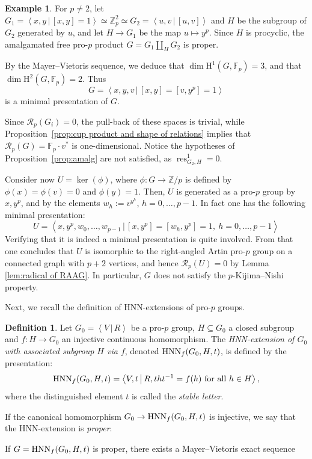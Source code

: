 \documentclass{amsart}
\theoremstyle{definition}
\newtheorem{defn}[thm]{Definition}
\newtheorem{ex}[thm]{Example}
\theoremstyle{remark}
\DeclareMathOperator{\res}{res}
\newcommand{\HNN}{{\rm HNN}}
\newcommand{\ZZ}{\mathbb{Z}}
\newcommand{\FF}{\mathbb{F}}
\newcommand{\calR}{\mathcal{R}}
\newcommand{\rmH}{\mathrm H}%
\newcommand{\pres}[2]{\left\langle{#1}\, \big\vert\, {#2}\right\rangle}
\newcommand{\Z}{\ZZ}
\begin{document}
\begin{ex}
	For $p \neq 2$, let $G_1=\pres{x,y}{[x,y]=1}\simeq \ZZ_p^2\simeq G_2=\pres{u,v}{[u,v]}$ and $H$ be the subgroup of $G_2$ generated by $u$, and let $H\to G_1$ be the map $u\mapsto y^p$. Since $H$ is procyclic, the amalgamated free pro-$p$ product $G=G_1\amalg_H G_2$ is proper.
	
 	By the Mayer--Vietoris sequence, we deduce that $\dim\rmH^1(G,\FF_p)=3$, and that $\dim\rmH^2(G,\FF_p)=2$. Thus \[G=\pres{x,y,v}{[x,y]=[v,y^p]=1}\] is a minimal presentation of $G$. 
 	
 	Since $\calR_p(G_i)=0$, the pull-back of these spaces is trivial, while Proposition~\ref{prop:cup product and shape of relations} implies that $\calR_p(G)=\FF_p\cdot v^\ast$ is one-dimensional. Notice the hypotheses of Proposition~\ref{prop:amalg} are not satisfied, as $\res^1_{G_2,H}=0$.

    
 	Consider now $U=\ker(\phi)$, where $\phi:G\to \Z/p$ is defined by $\phi(x)=\phi(v)=0$ and $\phi(y)=1$. 
 	Then, $U$ is generated as a pro-$p$ group by $x,y^p$, and by the elements $w_h:=v^{y^h}$, $h=0,\dots,p-1$. In fact one has the following minimal presentation:
    \[U=\pres{x,y^p,w_0,\dots,w_{p-1}}{[x,y^p]=[w_h,y^p]=1,\ h=0,\dots,p-1}\]
    Verifying that it is indeed a minimal presentation is quite involved. From that one concludes that $U$ is isomorphic to the right-angled Artin pro-$p$ group on a connected graph with $p+2$ vertices, and hence $\calR_p(U)=0$ by Lemma \ref{lem:radical of RAAG}. In particular, $G$ does not satisfy the $p$-Kijima--Nishi property. 
\end{ex}
Next, we recall the definition of HNN-extensions of pro-$p$ groups.
\begin{defn}
Let $G_0 = \pres{V }{ R}$ be a pro-$p$ group, $H \subseteq G_0$ a closed subgroup and $f:H \to G_0$ an injective continuous homomorphism. The \emph{HNN-extension of $G_0$ with associated subgroup $H$ via $f$}, denoted $\HNN_f(G_0,H,t)$, is defined by the presentation:
$$\HNN_f(G_0,H,t) = \pres{ V, t}{R, tht^{-1} = f(h) \text{ for all } h \in H },$$
where the distinguished element $t$ is called the \emph{stable letter}.

If the canonical homomorphism $G_0\to \HNN_f(G_0,H,t)$ is injective, we say that the HNN-extension is \emph{proper}.
\end{defn}
If $G=\HNN_f(G_0,H,t)$ is proper, there exists a Mayer--Vietoris exact sequence
\end{document}
